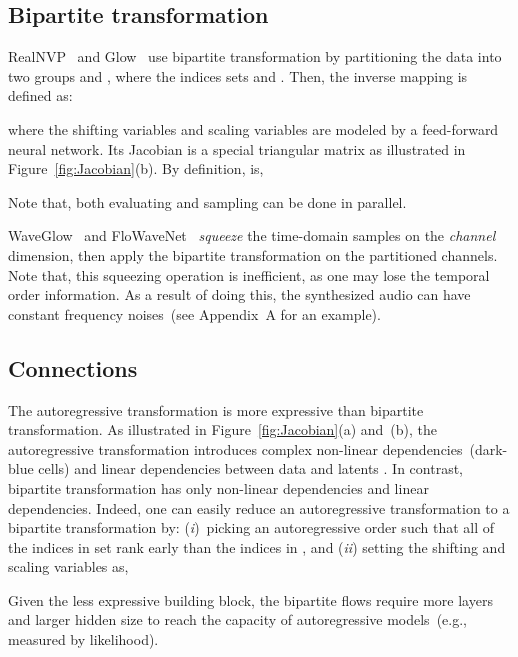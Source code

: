 \documentclass{article}
\begin{document}
\vspace{-.2em}
\subsection{Bipartite transformation}
\vspace{-.1em}
RealNVP~\citep{dinh2016density} and Glow~\citep{kingma2018glow} use bipartite transformation by partitioning the data  into two groups  and , where the indices sets  and . Then, the inverse mapping  is defined as:

where the shifting variables  and scaling variables  are modeled by a feed-forward neural network.
Its Jacobian  is a special triangular matrix as illustrated in Figure~\ref{fig:Jacobian}(b).
By definition,   is,

Note that, both evaluating  and sampling   can be done in parallel.


WaveGlow~\citep{prenger2019waveglow} and FloWaveNet~\citep{kim2018flowavenet} \emph{squeeze} the time-domain samples on the \emph{channel} dimension, then apply the bipartite transformation  on the partitioned channels. 
Note that, this squeezing operation is inefficient, as one may lose the temporal order information.
As a result of doing this, the synthesized audio can have constant frequency noises~(see Appendix~A for an example).

\vspace{-.2em}
\subsection{Connections}
\label{subsec:auto_vs_bipartite}
\vspace{-.1em}
The autoregressive transformation is more expressive than bipartite transformation.
As illustrated in Figure~\ref{fig:Jacobian}(a) and~(b), the autoregressive transformation introduces  complex non-linear dependencies~(dark-blue cells) and  linear dependencies between data  and latents . 
In contrast, bipartite transformation has only  non-linear dependencies and  linear dependencies.
Indeed, one can easily reduce an autoregressive transformation  to a bipartite transformation  by: (\emph{i})~picking an autoregressive order  such that all of the indices in set  rank early than the indices in , and (\emph{ii}) setting the shifting and scaling variables as,
\vspace{-.6em}

Given the less expressive building block, the bipartite flows require more layers and larger hidden size to reach the capacity of autoregressive models~(e.g., measured by likelihood).
\end{document}
